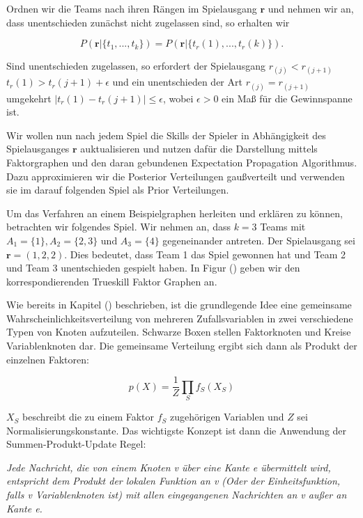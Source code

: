 \documentclass[12pt,a4paper]{scrartcl}
\numberwithin{equation}{section}
\begin{document}
 Ordnen wir die Teams nach ihren Rängen im Spielausgang $\mathbf{r}$ und nehmen wir an, dass unentschieden zunächst nicht zugelassen sind, so erhalten wir
 
 \begin{equation}
  P(\mathbf{r}| \{t_1,...,t_k\}) = P(\mathbf{r}| \{t_r(1),...,t_r(k)\}).
 \end{equation}

 Sind unentschieden zugelassen, so erfordert der Spielausgang $r_(j) < r_(j+1)$ $t_r(1) > t_r(j+1) + \epsilon$ und ein unentschieden der Art $r_(j) = r_(j+1)$ umgekehrt 
 $|t_r(1) - t_r(j+1)| \leq \epsilon$, wobei $\epsilon > 0$ ein Maß für die Gewinnspanne ist.
 
 Wir wollen nun nach jedem Spiel die Skills der Spieler in Abhängigkeit des Spielausganges $\mathbf{r}$ auktualisieren und nutzen dafür die Darstellung mittels Faktorgraphen und
 den daran gebundenen Expectation Propagation Algorithmus. 
 Dazu approximieren wir die Posterior Verteilungen gaußverteilt und verwenden sie im darauf folgenden Spiel als Prior Verteilungen. 
 
 Um das Verfahren an einem Beispielgraphen herleiten und erklären zu können, betrachten wir folgendes Spiel. 
 Wir nehmen an, dass $k = 3$ Teams mit $A_1 = \{1\}, A_2 = \{2,3\} \text{ und } A_3 = \{4\}$ gegeneinander antreten. 
 Der Spielausgang sei $\mathbf{r} = (1,2,2)$. Dies bedeutet, dass Team 1 das Spiel gewonnen hat und Team 2 und Team 3 unentschieden gespielt haben. 
 In Figur () geben wir den korrespondierenden Trueskill Faktor Graphen an.
 
 Wie bereits in Kapitel () beschrieben, ist die grundlegende Idee eine gemeinsame Wahrscheinlichkeitsverteilung von mehreren Zufallsvariablen 
 in zwei verschiedene Typen von Knoten aufzuteilen. Schwarze Boxen stellen Faktorknoten und Kreise Variablenknoten dar. 
 Die gemeinsame Verteilung ergibt sich dann als Produkt der einzelnen Faktoren: 
 
 \begin{equation}
  p(X) = \frac{1}{Z} \prod_S f_S(X_S)
 \end{equation}
 
 $X_S$ beschreibt die zu einem Faktor $f_S$ zugehörigen Variablen und $Z$ sei Normalisierungskonstante. 
 Das wichtigste Konzept ist dann die Anwendung der Summen-Produkt-Update Regel: 
 
 \textit{Jede Nachricht, die von einem Knoten v über eine Kante e übermittelt wird, entspricht dem Produkt der lokalen Funktion an v (Oder der Einheitsfunktion, falls v Variablenknoten
 ist) mit allen eingegangenen Nachrichten an v außer an Kante e.}
 
\end{document}
